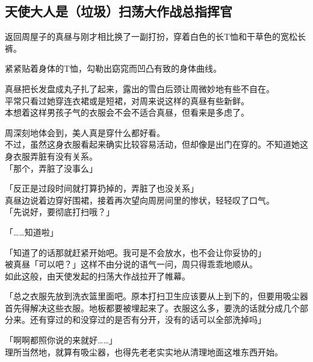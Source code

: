 \subsection{天使大人是（垃圾）扫荡大作战总指挥官}

返回周屋子的真昼与刚才相比换了一副打扮，穿着白色的长T恤和干草色的宽松长裤。

紧紧贴着身体的T恤，勾勒出窈窕而凹凸有致的身体曲线。

真昼把长发盘成丸子扎了起来，露出的雪白后颈让周微妙地有些不自在。\\

平常只看过她穿连衣裙或是短裙，对周来说这样的真昼有些新鲜。\\

本想着这样男孩子气的衣服会不会不适合真昼，但看来是多虑了。

周深刻地体会到，美人真是穿什么都好看。\\%

不过，虽然这身衣服看起来确实比较容易活动，但却像是出门在穿的。不知道她这身衣服弄脏有没有关系。\\

「那个，弄脏了没事么」

「反正是过段时间就打算扔掉的，弄脏了也没关系」\\

真昼边说着边穿好围裙，接着再次望向周房间里的惨状，轻轻叹了口气。\\

「先说好，要彻底打扫哦？」

「……知道啦」

「知道了的话那就赶紧开始吧。我可是不会放水，也不会让你妥协的」\\

被真昼「可以吧？」这样不由分说的语气一问，周只得乖乖地顺从。\\

如此这般，由天使发起的扫荡大作战拉开了帷幕。\\

\vspace{2\baselineskip}

「总之衣服先放到洗衣篮里面吧。原本打扫卫生应该要从上到下的，但要用吸尘器首先得解决这些衣服。地板都要被埋起来了。衣服这么多，要洗的话就分成几个部分来。还有穿过的和没穿过的是否有分开，没有的话可以全部洗掉吗」

「啊啊都照你说的来就好……」\\

理所当然地，就算有吸尘器，也得先老老实实地从清理地面这堆东西开始。\\

